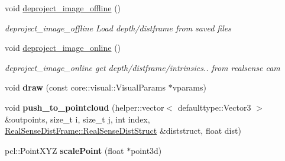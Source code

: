 \begin{DoxyCompactItemize}
void \hyperlink{classsofa_1_1rgbdtracking_1_1_real_sense_abstract_deprojector_ac0889ca4dee6e9980f9f28909d6f3ba6}{deproject\+\_\+image\+\_\+offline} ()
\begin{DoxyCompactList}\small\item\em deproject\+\_\+image\+\_\+offline Load depth/distframe from saved files \end{DoxyCompactList}\item 
\mbox{\label{classsofa_1_1rgbdtracking_1_1_real_sense_abstract_deprojector_a899c0a0245338c2b771138f667d1825c}} 
void \hyperlink{classsofa_1_1rgbdtracking_1_1_real_sense_abstract_deprojector_a899c0a0245338c2b771138f667d1825c}{deproject\+\_\+image\+\_\+online} ()
\begin{DoxyCompactList}\small\item\em deproject\+\_\+image\+\_\+online get depth/distframe/intrinsics.. from realsense cam \end{DoxyCompactList}\item 
\mbox{\label{classsofa_1_1rgbdtracking_1_1_real_sense_abstract_deprojector_a6e270c7bba84a068595aa361aa3f5f3c}} 
void {\bfseries draw} (const core\+::visual\+::\+Visual\+Params $\ast$vparams)
\item 
\mbox{\label{classsofa_1_1rgbdtracking_1_1_real_sense_abstract_deprojector_ad8bc6a2a7cfe182481496dd4e10e6e42}} 
void {\bfseries push\+\_\+to\+\_\+pointcloud} (helper\+::vector$<$ defaulttype\+::\+Vector3 $>$ \&outpoints, size\+\_\+t i, size\+\_\+t j, int index, \hyperlink{structsofa_1_1rgbdtracking_1_1_real_sense_dist_frame_1_1_real_sense_dist_struct}{Real\+Sense\+Dist\+Frame\+::\+Real\+Sense\+Dist\+Struct} \&diststruct, float dist)
\item 
\mbox{\label{classsofa_1_1rgbdtracking_1_1_real_sense_abstract_deprojector_a39b77c197afd5fe30322103da8c75b74}} 
pcl\+::\+Point\+X\+YZ {\bfseries scale\+Point} (float $\ast$point3d)
\end{DoxyCompactItemize}
